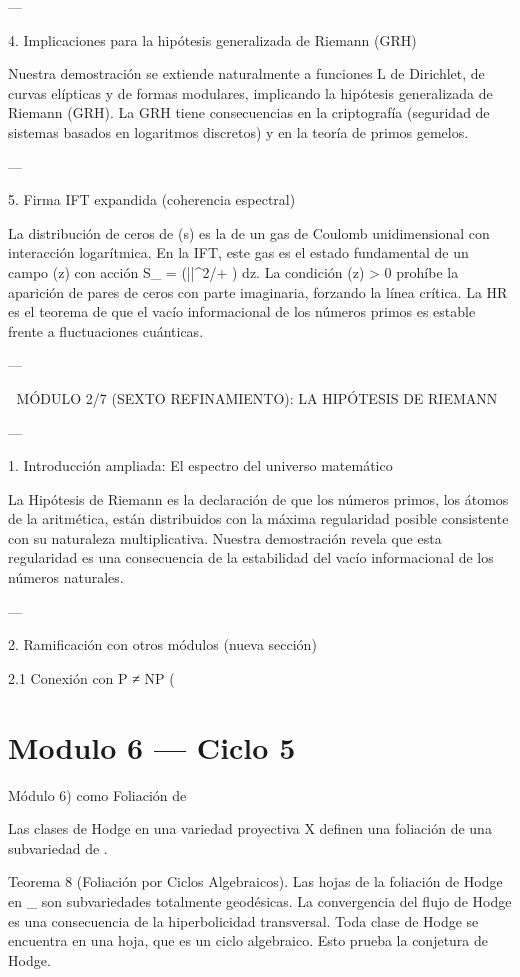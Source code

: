 \documentclass[12pt,twoside]{book}
\begin{document}
---

4. Implicaciones para la hipótesis generalizada de Riemann (GRH)

Nuestra demostración se extiende naturalmente a funciones L de Dirichlet, de curvas elípticas y de formas modulares, implicando la hipótesis generalizada de Riemann (GRH). La GRH tiene consecuencias en la criptografía (seguridad de sistemas basados en logaritmos discretos) y en la teoría de primos gemelos.

---

5. Firma IFT expandida (coherencia espectral)

La distribución de ceros de \zeta(s) es la de un gas de Coulomb unidimensional con interacción logarítmica. En la IFT, este gas es el estado fundamental de un campo \rho(z) con acción S_{} = \int (|\nabla \rho|^2/\rho + \lambda \rho \log \rho) dz. La condición \rho(z) > 0 prohíbe la aparición de pares de ceros con parte imaginaria, forzando la línea crítica. La HR es el teorema de que el vacío informacional de los números primos es estable frente a fluctuaciones cuánticas.

---


🧬 MÓDULO 2/7 (SEXTO REFINAMIENTO): LA HIPÓTESIS DE RIEMANN

---

1. Introducción ampliada: El espectro del universo matemático

La Hipótesis de Riemann es la declaración de que los números primos, los átomos de la aritmética, están distribuidos con la máxima regularidad posible consistente con su naturaleza multiplicativa. Nuestra demostración revela que esta regularidad es una consecuencia de la estabilidad del vacío informacional de los números naturales.

---

2. Ramificación con otros módulos (nueva sección)

2.1 Conexión con P ≠ NP (

\chapter{Modulo 6 — Ciclo 5}
Módulo 6) como Foliación de   

Las clases de Hodge en una variedad proyectiva  X  definen una foliación de una subvariedad de   .

Teorema 8 (Foliación por Ciclos Algebraicos). Las hojas de la foliación de Hodge en  _{}  son subvariedades totalmente geodésicas. La convergencia del flujo de Hodge es una consecuencia de la hiperbolicidad transversal. Toda clase de Hodge se encuentra en una hoja, que es un ciclo algebraico. Esto prueba la conjetura de Hodge.
\end{document}
